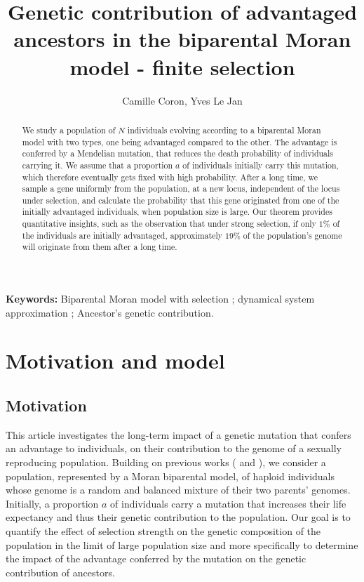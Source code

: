 \documentclass[11pt]{article}
\title{Genetic contribution of advantaged ancestors in the biparental Moran model - finite selection}
\author{Camille Coron, Yves Le Jan}
\date{}
\theoremstyle{remark}
\numberwithin{equation}{section}
\begin{document}
\maketitle

 
\begin{abstract}
We study a population of $N$ individuals evolving according to a biparental Moran model with two types, one being advantaged compared to the other. The advantage is conferred by a Mendelian mutation, that reduces the death probability of individuals carrying it. We assume that a proportion $a$ of individuals initially carry this mutation, which therefore eventually gets fixed with high probability. After a long time, we sample a gene uniformly from the population, at a new locus, independent of the locus under selection, and calculate the probability that this gene originated from one of the initially advantaged individuals, when population size is large. Our theorem provides quantitative insights, such as the observation that under strong selection, if only $1\%$ of the individuals are initially advantaged, approximately $19\%$ of the population's genome will originate from them after a long time.
\end{abstract}

\textbf{Keywords:} Biparental Moran model with selection ; dynamical system approximation ; Ancestor's genetic contribution.


\section{Motivation and model}

\subsection{Motivation}

This article investigates the long-term impact of a genetic mutation that confers an advantage to individuals, on their contribution to the genome of a sexually reproducing population. Building on previous works (\cite{geneal} and \cite{CoronLeJan22}), we consider a population, represented by a Moran biparental model, of haploid individuals whose genome is a random and balanced mixture of their two parents' genomes. Initially, a proportion $a$ of individuals carry a mutation that increases their life expectancy and thus their genetic contribution to the population. Our goal is to quantify the effect of selection strength on the genetic composition of the population in the limit of large population size and more specifically to determine the impact of the advantage conferred by the mutation on the genetic contribution of ancestors.
\end{document}
